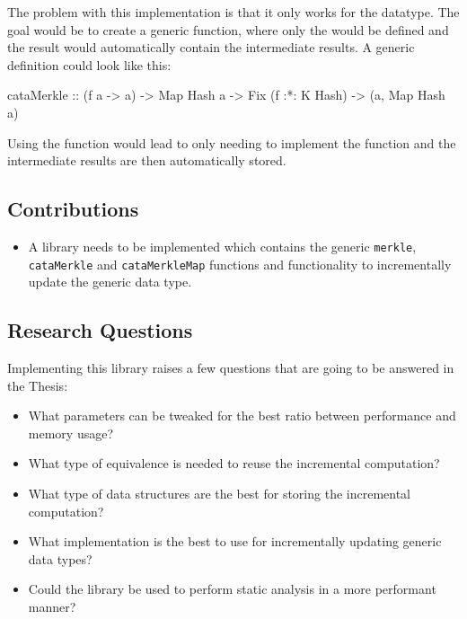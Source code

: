 The problem with this implementation is that it only works for the  datatype. The goal would be to create a generic function, where only the  would be defined and the result would automatically contain the intermediate results. A generic definition could look like this:

\begin{haskell}
cataMerkle :: (f a -> a) -> Map Hash a -> Fix (f :*: K Hash) -> (a, Map Hash a)
\end{haskell}

Using the  function would lead to only needing to implement the  function and the intermediate results are then automatically stored.

\subsection{Contributions}
\begin{itemize}
    \item A library needs to be implemented which contains the generic \texttt{merkle}, \texttt{cataMerkle} and \texttt{cataMerkleMap} functions and functionality to incrementally update the generic data type.
\end{itemize}

\subsection{Research Questions}
Implementing this library raises a few questions that are going to be answered in the \newline Thesis:
\begin{itemize}
    \item What parameters can be tweaked for the best ratio between performance and memory usage?
    \item What type of equivalence is needed to reuse the incremental computation?
    \item What type of data structures are the best for storing the incremental computation?
    \item What implementation is the best to use for incrementally updating generic data types?
    \item Could the library be used to perform static analysis in a more performant manner?
\end{itemize}